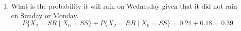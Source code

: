 \documentclass[12pt]{article}
\begin{document}
\begin{enumerate}[label=(\alph*)]
    \item What is the probability it will rain on Wednesday given that it did not rain on Sunday or Monday.\\
    $$P\{X_2 = SR \;|\; X_0 =SS\} + P\{X_2 = RR\;|\;X_0 = SS\} = 0.21 + 0.18 = 0.39$$
\end{enumerate}



 
\end{document}
